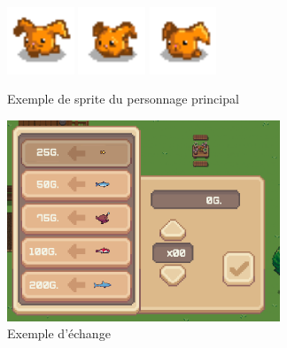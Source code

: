 \documentclass{article}
\begin{document}
\begin{figure}[h]
    \includegraphics[height = 2cm]{haricot/left_1.png}
    \includegraphics[height = 2cm]{haricot/left_2.png}
    \includegraphics[height = 2cm]{haricot/left_3.png}
    \caption{Exemple de sprite du personnage principal}\label{lapin_devant}
    \end{figure}

   
    \begin{figure}[h]
        \includegraphics[height = 6cm]{trade.png}
        \centering
        \caption{Exemple d'échange}
        \label{fig:trade}
    \end{figure}
        
\end{document}
